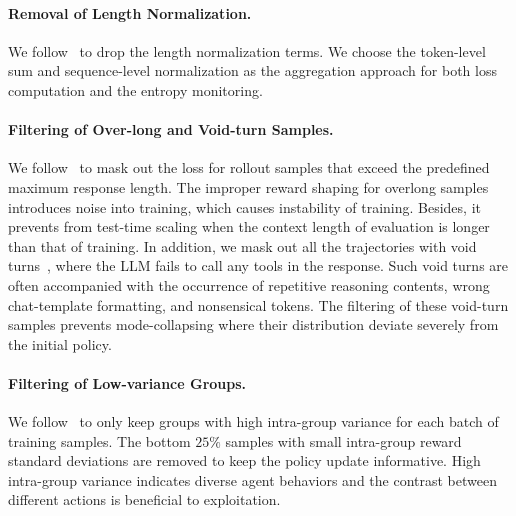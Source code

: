 \documentclass[]{youtu} %
\begin{document}
\paragraph{Removal of Length Normalization.}
We follow~\cite{liu2025understanding} to drop the length normalization terms.
We choose the token-level sum and sequence-level normalization as the aggregation approach for both loss computation and the entropy monitoring.


\paragraph{Filtering of Over-long and Void-turn Samples.}
We follow~\cite{bespoke_improving_multi_turn_tool_use,yu2025dapo} to mask out the loss for rollout samples that exceed the predefined maximum response length.
The improper reward shaping for overlong samples introduces noise into training,
which causes instability of training.
Besides,
it prevents from test-time scaling when the context length of evaluation is longer than that of training.
In addition,
we mask out all the trajectories with void turns~\cite{xue2025simpletir},
where the LLM fails to call any tools in the response.
Such void turns are often accompanied with the occurrence of repetitive reasoning contents,
wrong chat-template formatting,
and nonsensical tokens.
The filtering of these void-turn samples prevents mode-collapsing where their distribution deviate severely from the initial policy.


\paragraph{Filtering of Low-variance Groups.}
We follow~\cite{wang2025ragen} to only keep groups with high intra-group variance for each batch of training samples.
The bottom $25\%$ samples with small intra-group reward standard deviations are removed to keep the policy update informative.
High intra-group variance indicates diverse agent behaviors and the contrast between different actions is beneficial to exploitation.
\end{document}
